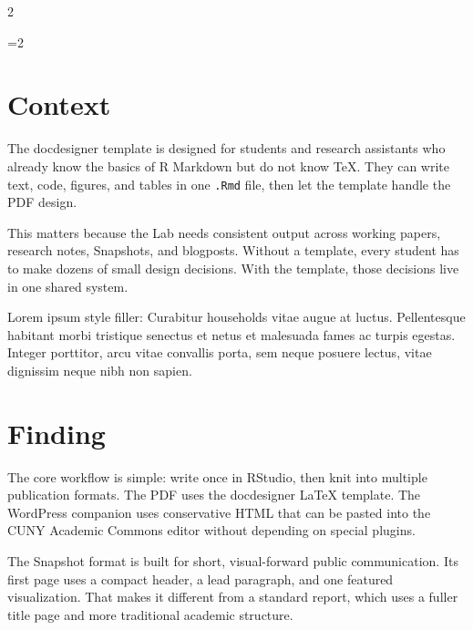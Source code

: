\documentclass[12pt]{article}
\newif\ifdocdesignerdocdesigner
\newif\ifdocdesigneranon
\newcommand{\docdesignermaincolumns}{1}
\begin{document}
\begin{paracol}{2}

\ifdocdesignerdocdesigner\else
\ifnum\docdesignermaincolumns=2\relax
  \twocolumn
\fi
\fi

\ifdocdesigneranon
\begingroup
\small
\noindent\textit{This manuscript is set to anonymous mode. Identifying metadata fields are suppressed on the title page.}\par
\endgroup
\vspace{1em}
\fi

\section{Context}\label{context}

The docdesigner template is designed for students and research assistants who
already know the basics of R Markdown but do not know TeX. They can
write text, code, figures, and tables in one \texttt{.Rmd} file, then
let the template handle the PDF design.

This matters because the Lab needs consistent output across working
papers, research notes, Snapshots, and blogposts. Without a template,
every student has to make dozens of small design decisions. With the
template, those decisions live in one shared system.

Lorem ipsum style filler: Curabitur households vitae augue at luctus.
Pellentesque habitant morbi tristique senectus et netus et malesuada
fames ac turpis egestas. Integer porttitor, arcu vitae convallis porta,
sem neque posuere lectus, vitae dignissim neque nibh non sapien.

\section{Finding}\label{finding}

The core workflow is simple: write once in RStudio, then knit into
multiple publication formats. The PDF uses the docdesigner LaTeX template. The
WordPress companion uses conservative HTML that can be pasted into the
CUNY Academic Commons editor without depending on special plugins.

The Snapshot format is built for short, visual-forward public
communication. Its first page uses a compact header, a lead paragraph,
and one featured visualization. That makes it different from a standard
report, which uses a fuller title page and more traditional academic
structure.


\end{paracol}
\end{document}
